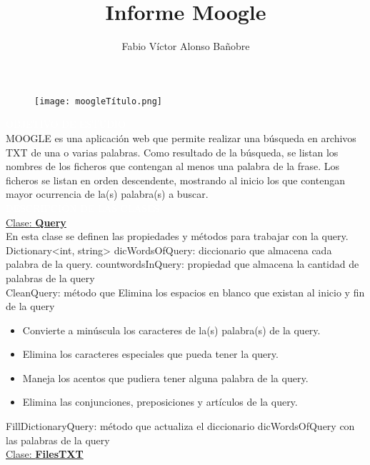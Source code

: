 \documentclass[10pt,a4paper]{article}
\author{Fabio Víctor Alonso Bañobre}
\title{Informe Moogle}
\begin{document}
  
\marginsize{2cm}{2cm}{2cm}{2cm}

\begin{figure}[t]
	\centering
	\texttt{[image: moogleTítulo.png]}
\end{figure}

\textcolor{White}{\colorbox{NavyBlue}{OBJETIVO DE ESTUDIO}}\\

MOOGLE es una aplicación web que permite realizar una búsqueda en archivos TXT de una o 
varias palabras. Como resultado de la búsqueda, se listan los nombres de los ficheros que 
contengan al menos una palabra de la frase.
Los ficheros se listan en orden descendente, mostrando al inicio los que contengan mayor 
ocurrencia de la(s) palabra(s) a buscar.\\

\textcolor{White}{\colorbox{NavyBlue}{DESCRIPCIÓN DE LAS CLASES}}\\


\underline{Clase: \textbf{Query}}\\

En esta clase se definen las propiedades y métodos para trabajar con la query. 
Dictionary<int, string> dicWordsOfQuery: diccionario que almacena cada palabra de la query.
countwordsInQuery: propiedad que almacena la cantidad de palabras de la query\\

CleanQuery: método que
 Elimina los espacios en blanco que existan al inicio y fin de la query\\
\begin{itemize}

\item Convierte a minúscula los caracteres de la(s) palabra(s) de la query.

\item Elimina los caracteres especiales que pueda tener la query.

\item Maneja los acentos que pudiera tener alguna palabra de la query.

\item Elimina las conjunciones, preposiciones y artículos de la query.\\
\end{itemize}

FillDictionaryQuery: método que actualiza el diccionario dicWordsOfQuery con las palabras de
la query\\

\underline{Clase: \textbf{FilesTXT}}\\
\end{document}
